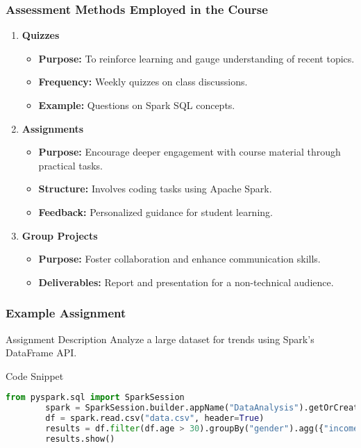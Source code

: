 \documentclass[aspectratio=169]{beamer}
\begin{document}
\begin{frame}
    \frametitle{Assessment Methods Employed in the Course}
    \begin{enumerate}
        \item \textbf{Quizzes}
        \begin{itemize}
            \item \textbf{Purpose:} To reinforce learning and gauge understanding of recent topics.
            \item \textbf{Frequency:} Weekly quizzes on class discussions.
            \item \textbf{Example:} Questions on Spark SQL concepts.
        \end{itemize}

        \item \textbf{Assignments}
        \begin{itemize}
            \item \textbf{Purpose:} Encourage deeper engagement with course material through practical tasks.
            \item \textbf{Structure:} Involves coding tasks using Apache Spark.
            \item \textbf{Feedback:} Personalized guidance for student learning.
        \end{itemize}

        \item \textbf{Group Projects}
        \begin{itemize}
            \item \textbf{Purpose:} Foster collaboration and enhance communication skills.
            \item \textbf{Deliverables:} Report and presentation for a non-technical audience.
        \end{itemize}
    \end{enumerate}
\end{frame}

\begin{frame}[fragile]
    \frametitle{Example Assignment}
    \begin{block}{Assignment Description}
        Analyze a large dataset for trends using Spark’s DataFrame API.
    \end{block}
    
    \begin{block}{Code Snippet}
        \begin{lstlisting}[language=Python]
        from pyspark.sql import SparkSession
        spark = SparkSession.builder.appName("DataAnalysis").getOrCreate()
        df = spark.read.csv("data.csv", header=True)
        results = df.filter(df.age > 30).groupBy("gender").agg({"income": "avg"})
        results.show()
        \end{lstlisting}
    \end{block}
\end{frame}
\end{document}

